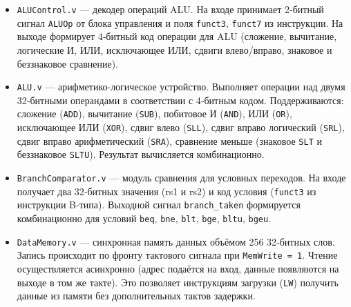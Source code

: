 \begin{itemize}
  \item \texttt{ALUControl.v} — декодер операций ALU. На входе принимает 2‑битный сигнал \texttt{ALUOp} от блока управления и поля \texttt{funct3}, \texttt{funct7} из инструкции. На выходе формирует 4‑битный код операции для ALU (сложение, вычитание, логические И, ИЛИ, исключающее ИЛИ, сдвиги влево/вправо, знаковое и беззнаковое сравнение).
  \item \texttt{ALU.v} — арифметико-логическое устройство. Выполняет операции над двумя 32‑битными операндами в соответствии с 4‑битным кодом. Поддерживаются: сложение (\texttt{ADD}), вычитание (\texttt{SUB}), побитовое И (\texttt{AND}), ИЛИ (\texttt{OR}), исключающее ИЛИ (\texttt{XOR}), сдвиг влево (\texttt{SLL}), сдвиг вправо логический (\texttt{SRL}), сдвиг вправо арифметический (\texttt{SRA}), сравнение меньше (знаковое \texttt{SLT} и беззнаковое \texttt{SLTU}). Результат вычисляется комбинационно.
  \item \texttt{BranchComparator.v} — модуль сравнения для условных переходов. На входе получает два 32‑битных значения (rs1 и rs2) и код условия (\texttt{funct3} из инструкции B-типа). Выходной сигнал \texttt{branch\_taken} формируется комбинационно для условий \texttt{beq}, \texttt{bne}, \texttt{blt}, \texttt{bge}, \texttt{bltu}, \texttt{bgeu}.
  \item \texttt{DataMemory.v} — синхронная память данных объёмом 256 32‑битных слов. Запись происходит по фронту тактового сигнала при \texttt{MemWrite = 1}. Чтение осуществляется асинхронно (адрес подаётся на вход, данные появляются на выходе в том же такте). Это позволяет инструкциям загрузки (\texttt{LW}) получить данные из памяти без дополнительных тактов задержки.
\end{itemize}

